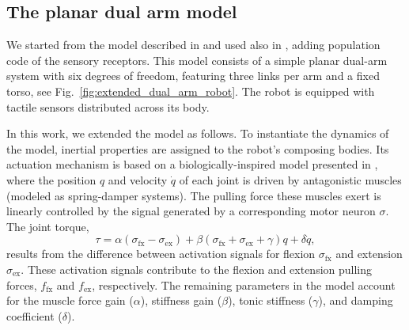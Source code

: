\subsection{The planar dual arm model}
We started from the model described in \cite{Mannella2018Knowyourbody} and used also in \cite{Marcel2022Learningreachown}, adding population code of the sensory receptors. This model consists of a simple planar dual-arm system with six degrees of freedom, featuring three links per arm and a fixed torso, see Fig.~\ref{fig:extended_dual_arm_robot}. The robot is equipped with tactile sensors distributed across its body. 

In this work, we extended the model as follows. 
To instantiate the dynamics of the model, inertial properties are assigned to the robot's composing bodies. Its actuation mechanism is based on a biologically-inspired model presented in \cite{Shim2012Chaoticexplorationlearning}, where the position $q$ and velocity $\dot{q}$ of each joint is driven by antagonistic muscles (modeled as spring-damper systems). The pulling force these muscles exert is linearly controlled by the signal generated by a corresponding motor neuron $\sigma$. The joint torque,
\begin{equation}\label{eq:antagonistic_torque}
	\tau = \alpha \left(\sigma_\mathrm{fx} - \sigma_\mathrm{ex}\right)  + \beta \left(\sigma_\mathrm{fx} + \sigma_\mathrm{ex} + \gamma \right) q + \delta \dot{q},
\end{equation}
results from the difference between activation signals for flexion $ \sigma_\mathrm{fx} $ and extension $\sigma_\mathrm{ex}$. These activation signals contribute to the flexion and extension pulling forces, $ f_\mathrm{fx}$ and $f_\mathrm{ex} $, respectively. The remaining parameters in the model account for the muscle force gain ($\alpha$), stiffness gain ($\beta$), tonic stiffness ($\gamma$), and damping coefficient ($\delta$).

